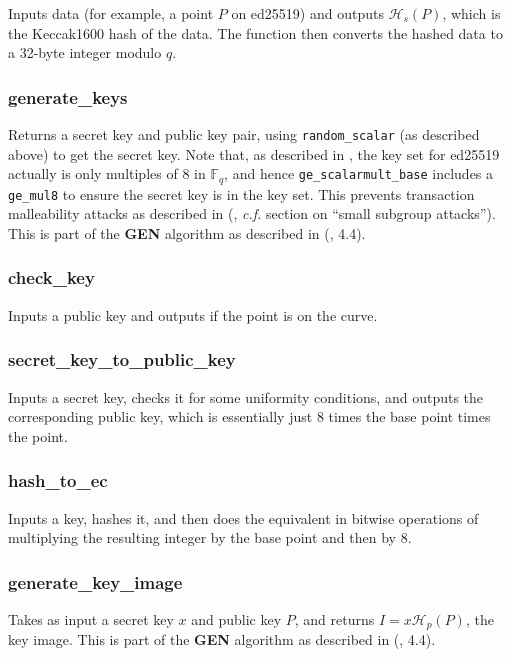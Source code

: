 \documentclass[12pt,english]{mrl}
\numberwithin{equation}{section}
\numberwithin{figure}{section}
\begin{document}
Inputs data (for example, a point $P$ on ed25519) and outputs $\mathcal{H}_{s}\left(P\right)$,
which is the Keccak1600 hash of the data. The function then converts
the hashed data to a 32-byte integer modulo $q$. 


\subsubsection{\label{sub:generate_keys}generate\_keys}

Returns a secret key and public key pair, using \texttt{random\_scalar} (as
described above) to get the secret key. Note that, as described in
\cite{Bern}, the key set for ed25519 actually is only multiples of
$8$ in $\mathbb{F}_{q}$, and hence \texttt{ge\_scalarmult\_base} includes
a \texttt{ge\_mul8} to ensure the secret key is in the key set. This prevents 
transaction malleability attacks as described in (\cite{Bern},
{\it c.f.} section on ``small subgroup attacks''). This is part of the
\textbf{GEN} algorithm as described in (\cite{CN}, 4.4).


\subsubsection{check\_key}

Inputs a public key and outputs if the point is on the curve.


\subsubsection{secret\_key\_to\_public\_key}

Inputs a secret key, checks it for some uniformity conditions, and
outputs the corresponding public key, which is essentially just $8$
times the base point times the point. 


\subsubsection{hash\_to\_ec}

Inputs a key, hashes it, and then does the equivalent in bitwise operations
of multiplying the resulting integer by the base point and then by $8$. 


\subsubsection{generate\_key\_image}

Takes as input a secret key $x$ and public key $P$, and returns
$I=x\mathcal{H}_{p}\left(P\right)$, the key image. This is part of
the \textbf{GEN} algorithm as described in (\cite{CN}, 4.4).
\end{document}
